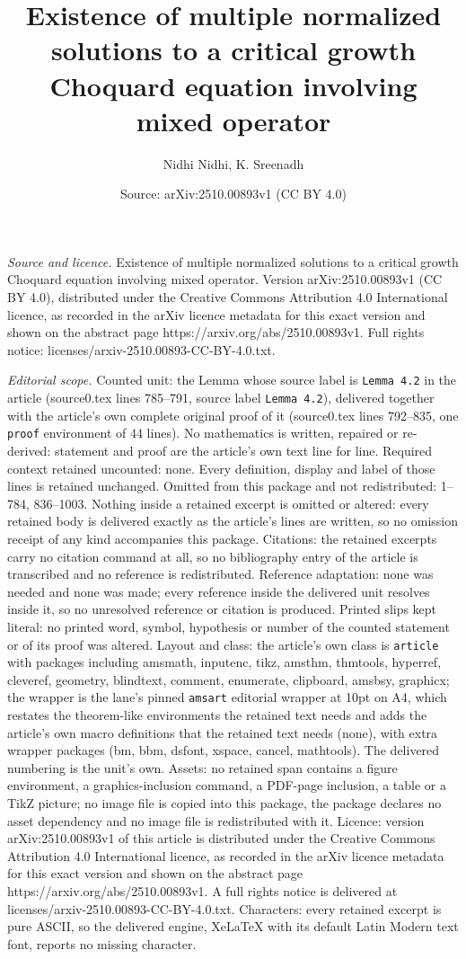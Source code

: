 \documentclass[10pt,a4paper]{amsart}
\title[Existence of multiple normalized solutions to a critical gro]{Existence of multiple normalized solutions to a critical growth Choquard equation involving mixed operator}
\author{Nidhi Nidhi, K. Sreenadh}
\date{Source: arXiv:2510.00893v1 (CC BY 4.0)}
\begin{document}
\maketitle

\noindent\emph{Source and licence.} Existence of multiple normalized solutions to a critical growth Choquard equation involving mixed operator. Version arXiv:2510.00893v1 (CC BY 4.0), distributed under the Creative Commons Attribution 4.0 International licence, as recorded in the arXiv licence metadata for this exact version and shown on the abstract page https://arxiv.org/abs/2510.00893v1. Full rights notice: licenses/arxiv-2510.00893-CC-BY-4.0.txt.\par\smallskip

\noindent\textit{Editorial scope.} Counted unit: the Lemma whose source label is \texttt{Lemma 4.2} in the article (source0.tex lines 785--791, source label \texttt{Lemma 4.2}), delivered together with the article's own complete original proof of it (source0.tex lines 792--835, one \texttt{proof} environment of 44 lines). No mathematics is written, repaired or re-derived: statement and proof are the article's own text line for line. Required context retained uncounted: none. Every definition, display and label of those lines is retained unchanged. Omitted from this package and not redistributed: 1--784, 836--1003. Nothing inside a retained excerpt is omitted or altered: every retained body is delivered exactly as the article's lines are written, so no omission receipt of any kind accompanies this package. Citations: the retained excerpts carry no citation command at all, so no bibliography entry of the article is transcribed and no reference is redistributed. Reference adaptation: none was needed and none was made; every reference inside the delivered unit resolves inside it, so no unresolved reference or citation is produced. Printed slips kept literal: no printed word, symbol, hypothesis or number of the counted statement or of its proof was altered. Layout and class: the article's own class is \texttt{article} with packages including amsmath, inputenc, tikz, amsthm, thmtools, hyperref, cleveref, geometry, blindtext, comment, enumerate, clipboard, amsbsy, graphicx; the wrapper is the lane's pinned \texttt{amsart} editorial wrapper at 10pt on A4, which restates the theorem-like environments the retained text needs and adds the article's own macro definitions that the retained text needs (none), with extra wrapper packages (bm, bbm, dsfont, xspace, cancel, mathtools). The delivered numbering is the unit's own. Assets: no retained span contains a figure environment, a graphics-inclusion command, a PDF-page inclusion, a table or a TikZ picture; no image file is copied into this package, the package declares no asset dependency and no image file is redistributed with it. Licence: version arXiv:2510.00893v1 of this article is distributed under the Creative Commons Attribution 4.0 International licence, as recorded in the arXiv licence metadata for this exact version and shown on the abstract page https://arxiv.org/abs/2510.00893v1. A full rights notice is delivered at licenses/arxiv-2510.00893-CC-BY-4.0.txt. Characters: every retained excerpt is pure ASCII, so the delivered engine, XeLaTeX with its default Latin Modern text font, reports no missing character.
\end{document}
